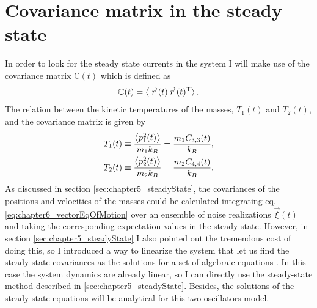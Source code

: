 \section{Covariance matrix in the steady state\label{sec:covMatrix}}
%
%
%
%
%
%
In order to look for the steady state currents in the system I will make use of the covariance matrix $\mathbb{C}(t)$ which is defined as
%
\begin{equation}
\mathbb{C}(t) = \expval{\overrightarrow{r}(t)\overrightarrow{r}(t)^\mathsf{T}}.
\end{equation}
%
The relation between the kinetic temperatures of the masses, $T_1(t)$ and  $T_2(t)$, and the covariance matrix is given by
%
\begin{align}
  T_1(t) &\equiv \frac{\expval{ p_1^2(t)}}{m_1 k_B} = \frac{m_1 C_{3,3}(t)}{k_B},
  \nonumber\\
   T_2(t) &\equiv \frac{\expval{ p_2^2(t)}}{m_2 k_B} = \frac{m_2 C_{4,4}(t)}{k_B}.
  \label{eq:chapter6_Temperature_definition}
\end{align}
%
As discussed in section \ref{sec:chapter5_steadyState}, the covariances of the positions and velocities of the masses could be calculated integrating eq. \eqref{eq:chapter6_vectorEqOfMotion} over an ensemble of noise realizations $\overrightarrow{\xi}(t)$ and taking the corresponding expectation values in the steady state. However, in section \ref{sec:chapter5_steadyState} I also pointed out the tremendous cost of doing this, so I introduced a way to linearize the system that let us find the steady-state covariances as the solutions for a set of algebraic equations \cite{Sarkka2019,Rieder1967,Casher1971}. In this case the system dynamics are already linear, so I can directly use the steady-state method described in \ref{sec:chapter5_steadyState}. Besides, the solutions of the steady-state equations will be analytical for this two oscillators model.


